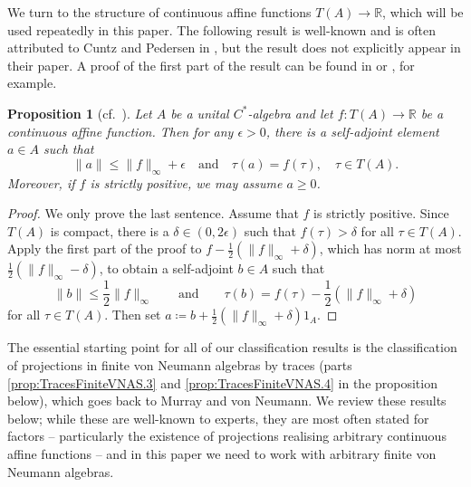 \documentclass[a4paper,11pt]{amsart}
\newtheorem{proposition}[theorem]{Proposition}
\theoremstyle{definition}
\numberwithin{equation}{section}
\numberwithin{theorem}{section}
\begin{document}
We turn to the structure of continuous affine functions $T(A) \rightarrow \mathbb R$, which will be used repeatedly in this paper. The following result is well-known and is often attributed to Cuntz and Pedersen in \cite{CP79}, but the result does not explicitly appear in their paper.  A proof of the first part of the result can be found in \cite[Lemma~6.2]{KR14} or \cite[Proposition~2.1]{CGSTW}, for example.

\begin{proposition}[cf.\ {\cite[Proposition 2.7]{CP79}}]
	\label{prop:CP}
	Let $A$ be a unital $C^*$-algebra and let $f\colon T(A) \to \mathbb R$ be a continuous affine function.
	Then for any $\epsilon>0$, there is a self-adjoint element $a \in A$ such that
	\begin{equation} \|a\| \leq \|f\|_\infty + \epsilon \quad \text{and} \quad \tau(a) = f(\tau), \quad \tau \in T(A). \end{equation}
	Moreover, if $f$ is strictly positive, we may assume $a \geq 0$.
\end{proposition}

\begin{proof}
	We only prove the last sentence.  Assume that $f$ is strictly positive.  Since $T(A)$ is compact, there is a $\delta \in (0, 2\epsilon)$ such that $f(\tau) > \delta$ for all $\tau \in T(A)$.   Apply the first part of the proof to $f - \frac12 (\|f\|_\infty + \delta)$, which has norm at most $\frac12(\|f\|_\infty - \delta)$, to obtain a self-adjoint $b \in A$ such that
	\begin{equation}
		\|b\| \leq \frac12 \|f\|_\infty\qquad \text{and} \qquad  \tau(b) = f(\tau) - \frac12 (\|f\|_\infty + \delta)
	\end{equation}
	for all $\tau \in T(A)$.  Then set $a \coloneqq b + \frac12 (\|f\|_\infty+ \delta) 1_A$.
\end{proof}

The essential starting point for all of our classification results is the classification of projections in finite von Neumann algebras by traces (parts \ref{prop:TracesFiniteVNAS.3} and \ref{prop:TracesFiniteVNAS.4} in the proposition below), which goes back to Murray and von Neumann.  We review these results below; while these are well-known to experts, they are most often stated for factors -- particularly the existence of projections realising arbitrary continuous affine functions -- and in this paper we need to work with arbitrary finite von Neumann algebras.
\end{document}
